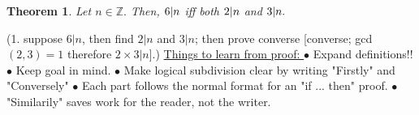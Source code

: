 \documentclass{article}
\newtheorem{theorem}{Theorem}                                       %
\begin{document}
\begin{theorem}
  Let $n \in \mathbb{Z}.$ Then, 
    $6 \arrowvert n$ iff both $2 \arrowvert n$ and $3 \arrowvert n.$
\end{theorem}
(1. suppose $6 | n$, then find $2 | n$ and $3 | n$; then prove converse [converse; gcd$(2, 3) = 1$ therefore $2 \times 3 | n$].)
\newline
\newline
\underline{Things to learn from proof: }
\newline
$\bullet$ Expand definitions!!
\newline
$\bullet$ Keep goal in mind.
\newline
$\bullet$ Make logical subdivision clear by writing "Firstly" and "Conversely"
\newline
$\bullet$ Each part follows the normal format for an "if ... then" proof.
\newline
$\bullet$ "Similarily" saves work for the reader, not the writer. 
\newpage
\end{document}

